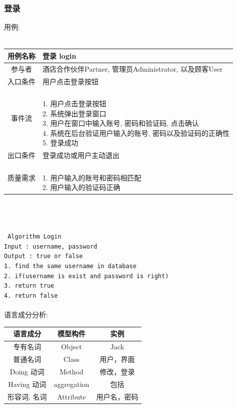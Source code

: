 \documentclass[11pt]{article}
\begin{document}
		\subsubsection{登录}
			用例: \\ \\
			\begin{tabular}{c|l}
			\hline
			用例名称 & 登录 login \\ \hline
			参与者 & 酒店合作伙伴Partner, 管理员Administrator, 以及顾客User  \\ \hline
			入口条件 & 用户点击登录按钮 \\ \hline
			事件流 & 	\parbox{33em}{\ \\
						1. 用户点击登录按钮 \\
						2. 系统弹出登录窗口 \\
						3. 用户在窗口中输入账号, 密码和验证码, 点击确认  \\
						4. 系统在后台验证用户输入的账号, 密码以及验证码的正确性 \\
						5. 登录成功 \\
						} \\ \hline
			出口条件 & 登录成功或用户主动退出 \\ \hline
			质量需求 & \parbox{33em}{\ \\
						1. 用户输入的账号和密码相匹配 \\
						2. 用户输入的验证码正确 \\
						} \\ \hline
			\end{tabular}\\ \\ \\
			\texttt{
			Algorithm Login \\
			Input : username, password \\
			Output : true or false \\
			1. find the same username in database \\
			2. if(username is exist and password is right) \\
			3.     return true \\
			4. return false \\
			} \\
			
			语言成分分析:
			\begin{center}
			\begin{tabular}{|c|c|c|}
			\hline
			语言成分 & 模型构件 & 实例\\ \hline
			专有名词 & Object & Jack  \\ \hline
			普通名词 & Class & 用户，界面 \\ \hline
			Doing 动词 & Method &  修改，登录 \\ \hline
			Having 动词 & aggregation & 包括 \\ \hline
			形容词, 名词 & Attribute & 用户名，密码 \\ \hline
			\end{tabular}
			\end{center}
			
\end{document}
